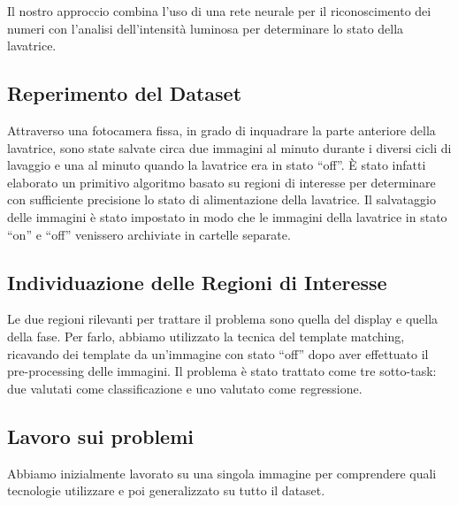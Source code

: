 \documentclass{article}
\begin{document}
\par Il nostro approccio combina l'uso di una rete neurale per il
riconoscimento dei numeri con l'analisi dell'intensità luminosa per
determinare lo stato della lavatrice.

\subsection{Reperimento del Dataset}\label{reperimento-del-dataset}

\par Attraverso una fotocamera fissa, in grado di inquadrare la parte
anteriore della lavatrice, sono state salvate circa due immagini al
minuto durante i diversi cicli di lavaggio e una al minuto quando la
lavatrice era in stato ``off''. È stato infatti elaborato un primitivo
algoritmo basato su regioni di interesse per determinare con sufficiente
precisione lo stato di alimentazione della lavatrice. Il salvataggio
delle immagini è stato impostato in modo che le immagini della lavatrice
in stato ``on'' e ``off'' venissero archiviate in cartelle separate.

\subsection{Individuazione delle Regioni di
Interesse}\label{individuazione-delle-regioni-di-interesse}

\par Le due regioni rilevanti per trattare il problema sono quella del
display e quella della fase. Per farlo, abbiamo utilizzato la tecnica
del template matching, ricavando dei template da un'immagine con stato
``off'' dopo aver effettuato il pre-processing delle immagini. Il
problema è stato trattato come tre sotto-task: due valutati come
classificazione e uno valutato come regressione.

\subsection{Lavoro sui problemi}\label{lavoro-sui-problemi}

\par Abbiamo inizialmente lavorato su una singola immagine per comprendere
quali tecnologie utilizzare e poi generalizzato su tutto il dataset.
\end{document}
